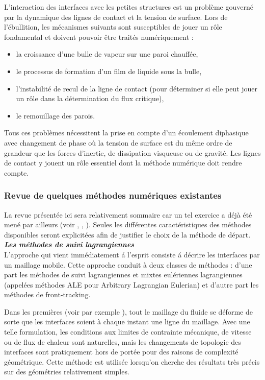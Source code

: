 L'interaction des interfaces avec les petites structures est un problème gouvern\'e
par la dynamique des lignes de contact et la tension de surface.
Lors de l'\'ebullition, les m\'ecanismes suivants sont susceptibles de jouer un r\^ole fondamental
et doivent pouvoir \^etre trait\'es num\'eriquement :
\begin{itemize}
  \item la croissance d'une bulle de vapeur sur une paroi chauff\'ee,
  \item le processus de formation d'un film de liquide sous la bulle,
  \item l'instabilit\'e de recul de la ligne de contact
        (pour d\'eterminer si elle peut jouer un r\^ole dans la d\'etermination du flux critique),
  \item le remouillage des parois.
\end{itemize}
Tous ces probl\`emes n\'ecessitent la prise en compte d'un \'ecoulement diphasique avec changement de phase
o\`u la tension de surface est du m\^eme ordre de grandeur que les forces d'inertie,
de dissipation visqueuse ou de gravit\'e.
Les lignes de contact y jouent un r\^ole essentiel dont la m\'ethode num\'erique doit rendre compte.


\subsubsection{Revue de quelques m\'ethodes num\'eriques existantes}

La revue pr\'esent\'ee ici sera relativement sommaire car un tel exercice
a d\'ej\`a \'et\'e men\'e par ailleurs (voir \cite{Jamet2002}, \cite{Duquennoy2000}, \cite{Lebaigue1998}).
Seules les diff\'erentes caract\'eristiques des m\'ethodes disponibles seront explicit\'ees
afin de justifier le choix de la m\'ethode de d\'epart.
\smallskip \\

\textit{\textbf{Les m\'ethodes de suivi lagrangiennes}}
\smallskip \\

L'approche qui vient imm\'ediatement \'a l'esprit consiste \'a d\'ecrire les interfaces par un maillage mobile.
Cette approche conduit \`a deux classes de m\'ethodes :
d'une part les m\'ethodes de suivi lagrangiennes et mixtes eul\'eriennes lagrangiennes
(appel\'ees m\'ethodes ALE pour Arbitrary Lagrangian Eulerian)
et d'autre part les m\'ethodes de front-tracking.

Dans les premi\`eres (voir par exemple \cite{Maury1996}), tout le maillage du fluide se d\'eforme
de sorte que les interfaces soient \`a chaque instant une ligne du maillage.
Avec une telle formulation, les conditions aux limites de contrainte m\'ecanique,
de vitesse ou de flux de chaleur sont naturelles, mais les changements de topologie des interfaces
sont pratiquement hors de port\'ee pour des raisons de complexit\'e g\'eom\'etrique.
Cette m\'ethode est utilis\'ee lorsqu'on cherche des r\'esultats très pr\'ecis
sur des g\'eom\'etries relativement simples.
\smallskip \\

